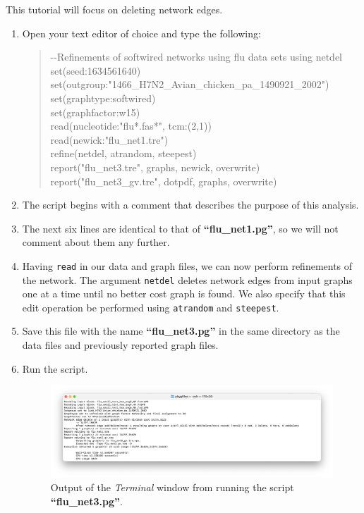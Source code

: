\documentclass[11pt]{article}
\begin{document}
This tutorial will focus on deleting network edges.

\begin {enumerate}

\item Open your text editor of choice and type the following:

	\begin{quote}	
	-\/-Refinements of softwired networks using flu data sets using netdel\\
	set(seed:1634561640)\\
	set(outgroup:"1466\_H7N2\_Avian\_chicken\_pa\_1490921\_2002")\\
	set(graphtype:softwired)\\
	set(graphfactor:w15)\\ 
	read(nucleotide:"flu*.fas*", tcm:(2,1))\\
	read(newick:"flu\_net1.tre")\\
	refine(netdel, atrandom, steepest)\\
	report("flu\_net3.tre", graphs, newick, overwrite)\\
	report("flu\_net3\_gv.tre", dotpdf, graphs, overwrite)
	\end{quote}

\item The script begins with a comment that describes the purpose of this 
analysis.

\item The next six lines are identical to that of \textbf{``flu\_net1.pg''}, so we 
will not comment about them any further. 

\item Having \texttt{read} in our data and graph files, we can now perform 
refinements of the network. The argument \texttt{netdel} deletes network edges 
from input graphs one at a time until no better cost graph is found. We also 
specify that this edit operation be performed using \texttt{atrandom} and 
\texttt{steepest}.

\item Save this file with the name \textbf{``flu\_net3.pg''} in the same directory 
as the data files and previously reported graph files.

\item Run the script.

\begin{figure}[H]
\centering
\includegraphics[width=\textwidth]{output2.png}
\caption{Output of the \textit{Terminal} window from running the script 
\textbf{``flu\_net3.pg''}.}
\label{output2}
\end{figure}


\end{enumerate}
\end{document}
